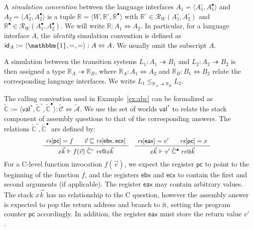 \documentclass[sigplan,10pt,review]{acmart}
\newcommand{\figsize}{\small}
\newcommand{\kw}[1]{\ensuremath{ \mathsf{#1} }}
\newcommand{\que}{\circ}
\newcommand{\ans}{\bullet}
\begin{document}
\begin{definition} \label{def:simconv} %
A \emph{simulation convention} between the language interfaces
$A_1 = \langle A_1^\que, A_1^\ans \rangle$ and
$A_2 = \langle A_2^\que, A_2^\ans \rangle$
is a tuple $\mathbb{R} = \langle W, \mathbb{R}^\que, \mathbb{R}^\ans \rangle$
with $\mathbb{R}^\que \in \mathcal{R}_W(A_1^\que, A_2^\que)$
and $\mathbb{R}^\ans \in \mathcal{R}_W(A_1^\ans, A_2^\ans)$.
We will write $\mathbb{R} : A_1 \Leftrightarrow A_2$.
In particular,
for a language interface $A$,
the \emph{identity} simulation convention
is defined as
$\kw{id}_A := \langle \mathbbm{1}, {=}, {=} \rangle
  : A \Leftrightarrow A$.
We usually omit the subscript $A$.
\end{definition}

A simulation between the transition systems
$L_1 : A_1 \twoheadrightarrow B_1$ and
$L_2 : A_2 \twoheadrightarrow B_2$
is then assigned a type $\mathbb{R}_A \twoheadrightarrow \mathbb{R}_B$,
where %
$\mathbb{R}_A : A_1 \Leftrightarrow A_2$ and
$\mathbb{R}_B : B_1 \Leftrightarrow B_2$
relate the corresponding language interfaces.
We write
$L_1 \le_{\mathbb{R}_A \twoheadrightarrow \mathbb{R}_B} L_2$.


\begin{example} %
The calling convention used in Example~\ref{ex:abc}
can be formalized as %
$\tilde{\mathbb{C}} :=
  \langle \kw{val}^*, \tilde{\mathbb{C}}^\que, \tilde{\mathbb{C}}^\ans \rangle :
    \tilde{\mathcal{C}} \Leftrightarrow \tilde{\mathcal{A}}$.
We use the set of worlds $\kw{val}^*$
to relate the stack component of
assembly questions to that of the corresponding answers.
The relations $\tilde{\mathbb{C}}^\que, \tilde{\mathbb{C}}^\ans$
are defined by:
\[
  \figsize
  \AxiomC{$\mathit{rs}[\kw{pc}] = f$}
  \AxiomC{\hspace{-1em} $\vec{v} \sqsubseteq \mathit{rs}[\kw{ebx}, \kw{ecx}]$}
  \BinaryInfC{$
    x \vec{k} \Vdash
    f(\vec{v}) \mathrel{\tilde{\mathbb{C}}^\que} \mathit{rs}@ x \vec{k}
  $}
  \DisplayProof
  \quad
  \AxiomC{$\mathit{rs}[\kw{eax}] = v'$}
  \AxiomC{\hspace{-1em} $\mathit{rs}[\kw{pc}] = x$}
  \BinaryInfC{$
    x \vec{k} \Vdash
    v' \mathrel{\tilde{\mathbb{C}}^\ans} \mathit{rs}@\vec{k}
  $}
  \DisplayProof
\]
For a C-level function invocation $f(\vec{v})$,
we expect the register $\kw{pc}$ to point to
the beginning of the function $f$,
and the registers $\kw{ebx}$ and $\kw{ecx}$
to contain the first and second arguments (if applicable).
The register $\kw{eax}$ may contain arbitrary values.
The stack $x \vec{k}$ has no relationship to the C question,
however the assembly answer is expected to pop the return address
and branch to it, setting the program counter $\kw{pc}$ accordingly.
In addition,
the register $\kw{eax}$
must store
the return value $v'$.
\end{example}
\end{document}
